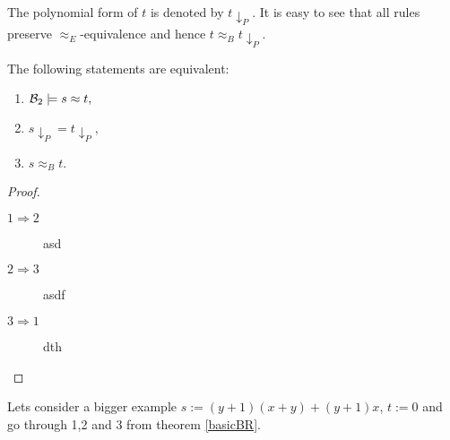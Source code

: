	The polynomial form of $t$ is denoted by $t{\downarrow_P}$. It is easy to see that all rules preserve $\approx_E$-equivalence and hence $t\approx_Bt{\downarrow_P}$.
	\begin{theorem}\label{basicBR}
		The following statements are equivalent:
		\begin{enumerate}
			\item ${\mathcal{B}_2}\models s\approx t,$
			\item $s{\downarrow_P}=t{\downarrow_P},$
			\item $s\approx_B t.$
		\end{enumerate}
	\end{theorem}
	\begin{proof}\mbox{}
		\begin{description}
			\item[$1\Rightarrow 2$] asd
			\item[$2\Rightarrow 3$] asdf
			\item[$3\Rightarrow 1$] dth
		\end{description}
	\end{proof}
	Lets consider a bigger example $s:=(y+1)(x+y)+(y+1)x$, $t:=0$ and go through 1,2 and 3 from theorem \ref{basicBR}.
